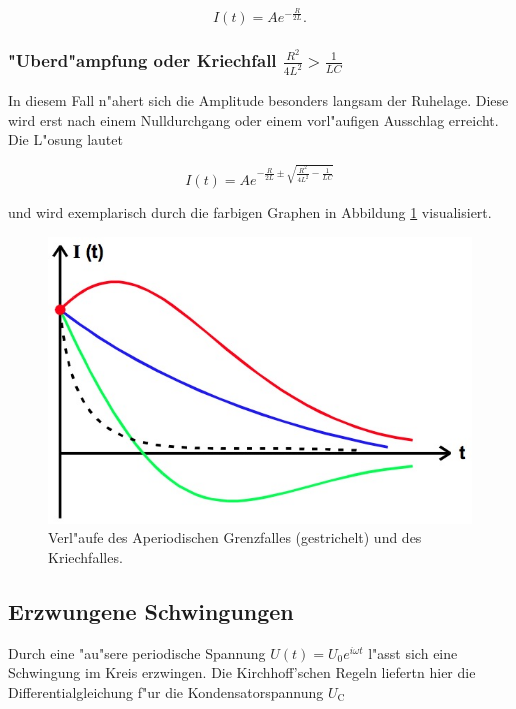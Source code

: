 		\begin{equation}
			I(t) = A e^{-\frac{R}{2L}}.
		\end{equation}

	\subsubsection{"Uberd"ampfung oder Kriechfall $\frac{R^2}{4L^2} > \frac{1}{LC}$}
		In diesem Fall n"ahert sich die Amplitude besonders langsam der Ruhelage.
		Diese wird erst nach einem Nulldurchgang oder einem vorl"aufigen Ausschlag erreicht.
		Die L"osung lautet

		\begin{equation}
			I(t) = Ae^{-\frac{R}{2L} \pm \sqrt{\frac{R^2}{4L^2} - \frac{1}{LC}}}
		\end{equation}

		und wird exemplarisch durch die farbigen Graphen in Abbildung \ref{fig:aperiodischer_fall} visualisiert.

		\begin{figure}[h!]
			\centering
			\includegraphics[width = 15cm]{img/aperiodisch.jpg}
			\caption{Verl"aufe des Aperiodischen Grenzfalles (gestrichelt) und des Kriechfalles.}
			\label{fig:aperiodischer_fall}
		\end{figure}

	\subsection{Erzwungene Schwingungen}

		Durch eine "au"sere periodische Spannung $U(t) = U_0 e^{i\omega t}$ l"asst sich eine Schwingung im Kreis erzwingen.
		Die Kirchhoff'schen Regeln liefertn hier die Differentialgleichung f"ur die Kondensatorspannung $U_\mathrm{C}$

